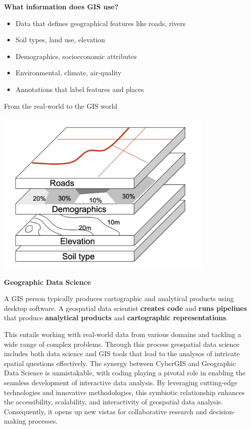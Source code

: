 \documentclass[
  letterpaper,
  DIV=11,
  numbers=noendperiod]{scrreprt}
\providecommand{\tightlist}{%
  \setlength{\itemsep}{0pt}\setlength{\parskip}{0pt}}\usepackage{longtable,booktabs,array}
\begin{document}
\textbf{What information does GIS use?}

\begin{itemize}
\tightlist
\item
  Data that defines geographical features like roads, rivers
\item
  Soil types, land use, elevation
\item
  Demographics, socioeconomic attributes
\item
  Environmental, climate, air-quality
\item
  Annotations that label features and places
\end{itemize}

From the real-world to the GIS world

\includegraphics[width=0.8\textwidth,height=\textheight]{./img/layers.png}

\textbf{Geographic Data Science}

A GIS person typically produces cartographic and analytical products
using desktop software. A geospatial data scientist \textbf{creates
code} and \textbf{runs pipelines} that produce \textbf{analytical
products} and \textbf{cartographic representations}.

This entails working with real-world data from various domains and
tackling a wide range of complex problems. Through this process
geospatial data science includes both data science and GIS tools that
lead to the analysos of intricate spatial questions effectively. The
synergy between CyberGIS and Geographic Data Science is unmistakable,
with coding playing a pivotal role in enabling the seamless development
of interactive data analysis. By leveraging cutting-edge technologies
and innovative methodologies, this symbiotic relationship enhances the
accessibility, scalability, and interactivity of geospatial data
analysis. Consequently, it opens up new vistas for collaborative
research and decision-making processes.
\end{document}
